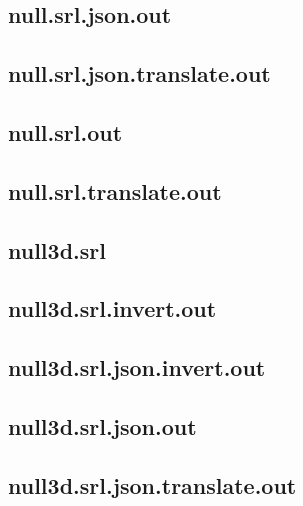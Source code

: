 \subsection{null.srl.json.out}
\label{app:null_srl.json.out}

\subsection{null.srl.json.translate.out}
\label{app:null_srl.json.translate.out}

\subsection{null.srl.out}
\label{app:null_srl.out}

\subsection{null.srl.translate.out}
\label{app:null_srl.translate.out}

\subsection{null3d.srl}
\label{app:null3d_srl}

\subsection{null3d.srl.invert.out}
\label{app:null3d_srl.invert.out}

\subsection{null3d.srl.json.invert.out}
\label{app:null3d_srl.json.invert.out}

\subsection{null3d.srl.json.out}
\label{app:null3d_srl.json.out}

\subsection{null3d.srl.json.translate.out}
\label{app:null3d_srl.json.translate.out}

